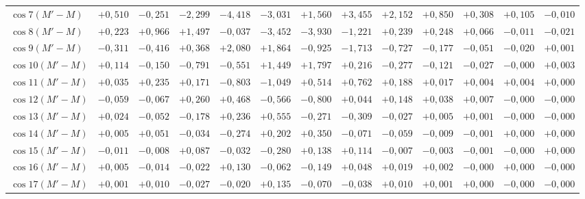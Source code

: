 \begin{landscape}
\begin{longtable}{@{}l|r|r|r|r|r|r|r|r|r|r|r|r@{}}
\(\cos 7(M'-M)\) & \(+0{,}510\) & \(-0{,}251\) & \(-2{,}299\) & \(-4{,}418\) & \(-3{,}031\) & \(+1{,}560\) & \(+3{,}455\) & \(+2{,}152\) & \(+0{,}850\) & \(+0{,}308\) & \(+0{,}105\) & \(-0{,}010\)\\
\(\cos 8(M'-M)\) & \(+0{,}223\) & \(+0{,}966\) & \(+1{,}497\) & \(-0{,}037\) & \(-3{,}452\) & \(-3{,}930\) & \(-1{,}221\) & \(+0{,}239\) & \(+0{,}248\) & \(+0{,}066\) & \(-0{,}011\) & \(-0{,}021\)\\
\(\cos 9(M'-M)\) & \(-0{,}311\) & \(-0{,}416\) & \(+0{,}368\) & \(+2{,}080\) & \(+1{,}864\) & \(-0{,}925\) & \(-1{,}713\) & \(-0{,}727\) & \(-0{,}177\) & \(-0{,}051\) & \(-0{,}020\) & \(+0{,}001\)\\
\(\cos 10(M'-M)\) & \(+0{,}114\) & \(-0{,}150\) & \(-0{,}791\) & \(-0{,}551\) & \(+1{,}449\) & \(+1{,}797\) & \(+0{,}216\) & \(-0{,}277\) & \(-0{,}121\) & \(-0{,}027\) & \(-0{,}000\) & \(+0{,}003\)\\
\(\cos 11(M'-M)\) & \(+0{,}035\) & \(+0{,}235\) & \(+0{,}171\) & \(-0{,}803\) & \(-1{,}049\) & \(+0{,}514\) & \(+0{,}762\) & \(+0{,}188\) & \(+0{,}017\) & \(+0{,}004\) & \(+0{,}004\) & \(+0{,}000\)\\
\(\cos 12(M'-M)\) & \(-0{,}059\) & \(-0{,}067\) & \(+0{,}260\) & \(+0{,}468\) & \(-0{,}566\) & \(-0{,}800\) & \(+0{,}044\) & \(+0{,}148\) & \(+0{,}038\) & \(+0{,}007\) & \(-0{,}000\) & \(-0{,}000\)\\
\(\cos 13(M'-M)\) & \(+0{,}024\) & \(-0{,}052\) & \(-0{,}178\) & \(+0{,}236\) & \(+0{,}555\) & \(-0{,}271\) & \(-0{,}309\) & \(-0{,}027\) & \(+0{,}005\) & \(+0{,}001\) & \(-0{,}000\) & \(-0{,}000\)\\
\(\cos 14(M'-M)\) & \(+0{,}005\) & \(+0{,}051\) & \(-0{,}034\) & \(-0{,}274\) & \(+0{,}202\) & \(+0{,}350\) & \(-0{,}071\) & \(-0{,}059\) & \(-0{,}009\) & \(-0{,}001\) & \(+0{,}000\) & \(+0{,}000\)\\
\(\cos 15(M'-M)\) & \(-0{,}011\) & \(-0{,}008\) & \(+0{,}087\) & \(-0{,}032\) & \(-0{,}280\) & \(+0{,}138\) & \(+0{,}114\) & \(-0{,}007\) & \(-0{,}003\) & \(-0{,}001\) & \(-0{,}000\) & \(+0{,}000\)\\
\(\cos 16(M'-M)\) & \(+0{,}005\) & \(-0{,}014\) & \(-0{,}022\) & \(+0{,}130\) & \(-0{,}062\) & \(-0{,}149\) & \(+0{,}048\) & \(+0{,}019\) & \(+0{,}002\) & \(-0{,}000\) & \(+0{,}000\) & \(-0{,}000\)\\
\(\cos 17(M'-M)\) & \(+0{,}001\) & \(+0{,}010\) & \(-0{,}027\) & \(-0{,}020\) & \(+0{,}135\) & \(-0{,}070\) & \(-0{,}038\) & \(+0{,}010\) & \(+0{,}001\) & \(+0{,}000\) & \(-0{,}000\) & \(-0{,}000\)\\

\end{longtable}
\end{landscape}
